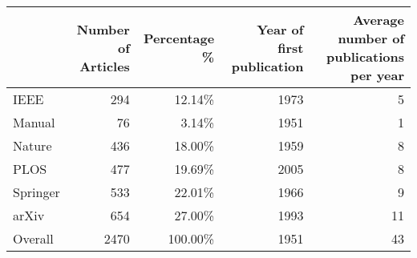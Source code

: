 \begin{tabular}{lrrrr}
\toprule
{} &  Number of Articles &  Percentage \% &  Year of first publication &  Average number of publications per year\\
\midrule
IEEE     &               294 &       12.14\% &                    1973 &                             5\\
Manual   &                76 &        3.14\% &                    1951 &                             1\\
Nature   &               436 &       18.00\% &                    1959 &                             8\\
PLOS     &               477 &       19.69\% &                    2005 &                             8\\
Springer &               533 &       22.01\% &                    1966 &                             9\\
arXiv    &               654 &       27.00\% &                    1993 &                            11\\
Overall  &              2470 &      100.00\% &                    1951 &                            43\\
\bottomrule
\end{tabular}
